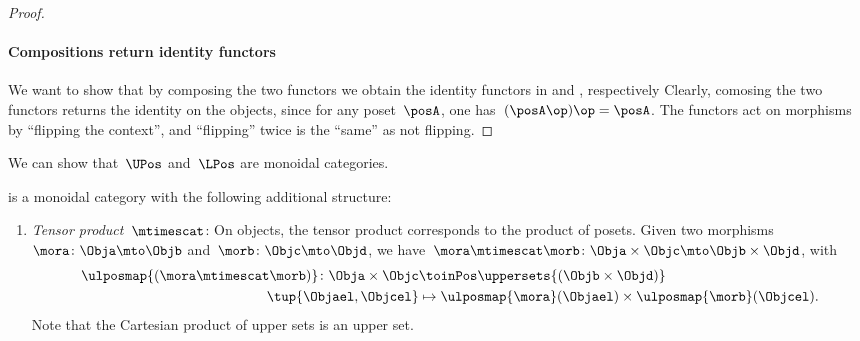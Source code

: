 \begin{proof}
    \paragraph*{Compositions return identity functors}
    We want to show that by composing the two functors we obtain the identity functors in \UPos and \LPos, respectively
    Clearly, comosing the two functors returns the identity on the objects, since for any poset~$\posA$, one has~$(\posA\op)\op=\posA$.
    The functors act on morphisms by ``flipping the context'', and ``flipping'' twice is the ``same'' as not flipping.
\end{proof}

We can show that~$\UPos$ and~$\LPos$ are monoidal categories.


\begin{lemma}
    \label{lem:upos_moncat}
    \UPos is a monoidal category with the following additional structure:
    \begin{enumerate}
        \item \emph{Tensor product~$\mtimescat$}: On objects, the tensor product corresponds to the product of posets.
        Given two morphisms~$\mora\colon \Obja\mto \Objb$ and~$\morb\colon \Objc\mto \Objd$, we have~$\mora \mtimescat \morb\colon  \Obja \times \Objc \mto \Objb\times \Objd$, with
        \begin{equation}
            \begin{aligned}
                \ulposmap{(\mora\mtimescat \morb)}\colon \Obja \times \Objc &\toinPos \uppersets{(\Objb\times \Objd)}\\
                \tup{\Objael,\Objcel}&\mapsto \ulposmap{\mora}(\Objael)\times \ulposmap{\morb}(\Objcel).
            \end{aligned}
        \end{equation}
        Note that the Cartesian product of upper sets is an upper set.


\end{enumerate}
\end{lemma}
